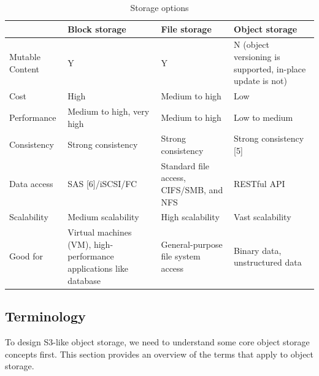 \documentclass{report}
\theoremstyle{definition}
\let\oldsubsection\subsection
\renewcommand{\subsection}{\oldsubsection*}
\begin{document}
\begin{table}[htbp]
\centering
\renewcommand{\arraystretch}{1.3}
\begin{tabularx}{\textwidth}{|l|X|X|X|}
\hline
 & \textbf{Block storage} & \textbf{File storage} & \textbf{Object storage} \\
\hline
Mutable Content & Y & Y & N (object versioning is supported, in-place update is not) \\
\hline
Cost & High & Medium to high & Low \\
\hline
Performance & Medium to high, very high & Medium to high & Low to medium \\
\hline
Consistency & Strong consistency & Strong consistency & Strong consistency [5] \\
\hline
Data access & SAS [6]/iSCSI/FC & Standard file access, CIFS/SMB, and NFS & RESTful API \\
\hline
Scalability & Medium scalability & High scalability & Vast scalability \\
\hline
Good for & Virtual machines (VM), high-performance applications like database & General-purpose file system access & Binary data, unstructured data \\
\hline
\end{tabularx}
\caption{Storage options}
\label{tab:storage-options}
\end{table}

\newpage
\subsection{Terminology}

To design S3-like object storage, we need to understand some core object storage concepts first. This section provides an overview of the terms that apply to object storage.
\end{document}
